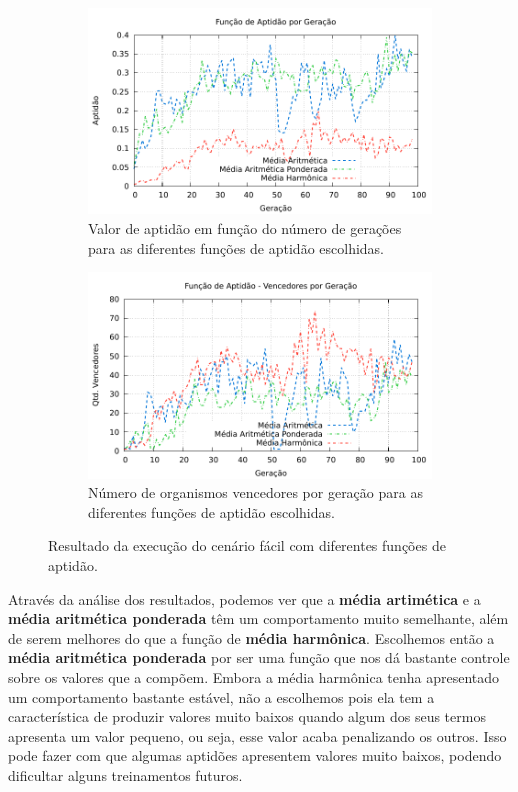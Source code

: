 \begin{figure}[H]
\centering
	\begin{subfigure}[b]{0.4\textwidth}
        \includegraphics[width=\textwidth]{fig/fitness-value-comparison.pdf}
        \caption{Valor de aptidão em função do número de gerações para as
        diferentes funções de aptidão escolhidas.}
	\end{subfigure}
	\begin{subfigure}[b]{0.4\textwidth}
        \includegraphics[width=\textwidth]{fig/fitness-winners-comparison.pdf}
        \caption{Número de organismos vencedores por geração para as diferentes
        funções de aptidão escolhidas.}
	\end{subfigure}

    \caption{Resultado da execução do cenário fácil com diferentes funções de
    aptidão.}
	\label{fig:fitness-experiment}
\end{figure}

Através da análise dos resultados, podemos ver que a \textbf{média
artimética} e a \textbf{média aritmética ponderada} têm um comportamento
muito semelhante, além de serem melhores do que a função de \textbf{média
harmônica}. Escolhemos então a \textbf{média aritmética ponderada} por ser
uma função que nos dá bastante controle sobre os valores que a compõem.
Embora a média harmônica tenha apresentado um comportamento bastante
estável, não a escolhemos  pois ela tem a característica de produzir
valores muito baixos quando algum dos seus termos apresenta um valor
pequeno, ou seja, esse valor acaba penalizando os outros. Isso pode fazer
com que algumas aptidões apresentem valores muito baixos, podendo
dificultar alguns treinamentos futuros.

